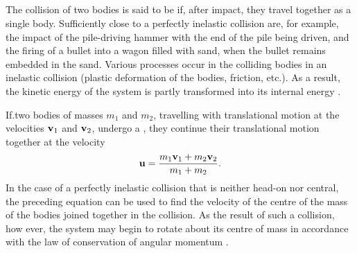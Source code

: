 \subsection{}\label{3.5.3} The collision of two bodies is said to be  if, after impact, they travel together as a single body. Suffi­ciently close to a perfectly inelastic collision are, for example, the impact of the pile-driving hammer with the end of the pile being driven, and the firing of a bullet into a wagon filled with sand, when the bullet remains embedded in the sand. Various processes occur in the colliding bodies in an inelastic collision (plastic deformation of the bodies, friction, etc.). As a result, the kinetic energy of the system is partly transformed into its internal energy .

If.two bodies of masses $m_{1}$ and $m_{2}$, travelling with translational motion at the velocities $\vb{v}_{1}$ and $\vb{v}_{2}$, undergo a , they continue their translational motion together at the velocity
\begin{equation*}%
\vb{u} = \frac{m_{1}\vb{v}_{1}+ m_{2}\vb{v}_{2}}{m_{1}+m_{2}}.
\end{equation*}
 In the case of a perfectly inelastic collision that is neither head-on nor central, the preceding equation can be used to find the velocity of the centre of the mass of the bodies joined to­gether in the collision. As the result of such a collision, how­ ever, the system may begin to rotate about its centre of mass in accordance with the law of conservation of angular momen­tum .

